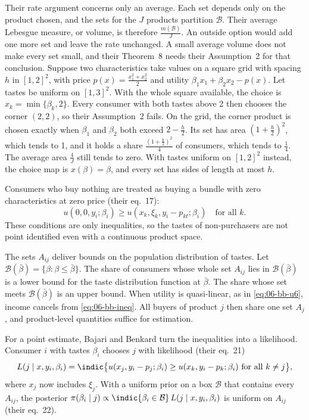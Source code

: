 Their rate argument concerns only an average. Each set depends only on the product chosen, and the sets for the $J$
products partition $\mathcal{B}$. Their average Lebesgue measure, or volume, is therefore $\frac{m(\mathcal{B})}{J}$. An
outside option would add one more set and leave the rate unchanged. A small average volume does not make every set
small, and their Theorem~8 needs their Assumption~2 for that conclusion. Suppose two characteristics take values on a square grid
with spacing $h$ in $[1,2]^2$, with price $p(x) = \frac{x_1^2 + x_2^2}{2}$ and utility $\beta_1 x_1 + \beta_2 x_2 - p(x)$. Let
tastes be uniform on $[1,3]^2$. With the whole square available, the choice is $x_k = \min\{\beta_k, 2\}$. Every
consumer with both tastes above 2 then chooses the corner $(2,2)$, so their Assumption~2 fails. On the grid, the corner product
is chosen exactly when $\beta_1$ and $\beta_2$ both exceed $2 - \frac{h}{2}$. Its set has area $(1 + \frac{h}{2})^2$,
which tends to 1, and it holds a share $\frac{(1 + \frac{h}{2})^2}{4}$ of consumers, which tends to $\frac{1}{4}$. The
average area $\frac{4}{J}$ still tends to zero. With tastes uniform on $[1,2]^2$ instead, the choice map is $x(\beta) =
\beta$, and every set has sides of length at most $h$.

Consumers who buy nothing are treated as buying a bundle with zero characteristics at zero price (their eq.~17):
\begin{equation*}
  u(0, 0, y_i; \beta_i) \ge u(x_k, \xi_k, y_i - p_{kt}; \beta_i) \quad\text{for all } k .
\end{equation*}
These conditions are only inequalities, so the tastes of non-purchasers are not point identified even with a continuous
product space.

The sets $A_{ij}$ deliver bounds on the population distribution of tastes. Let $\mathcal{B}(\bar\beta) = \{\beta : \beta \le
\bar\beta\}$. The share of consumers whose whole set $A_{ij}$ lies in $\mathcal{B}(\bar\beta)$ is a lower bound for the taste
distribution function at $\bar\beta$. The share whose set meets $\mathcal{B}(\bar\beta)$ is an upper bound. When utility is
quasi-linear, as in \eqref{eq:06-bb-u6}, income cancels from \eqref{eq:06-bb-ineq}. All buyers of product $j$ then share one
set $A_j$, and product-level quantities suffice for estimation.

For a point estimate, Bajari and Benkard turn the inequalities into a likelihood. Consumer $i$ with tastes $\beta_i$ chooses
$j$ with likelihood (their eq.~21)
\begin{equation}\label{eq:06-bb-lik}
  L(j \mid x, y_i, \beta_i) = \indic\bigl\{u(x_j, y_i - p_j; \beta_i) \ge u(x_k, y_i - p_k; \beta_i) \text{ for all } k \ne j\bigr\} ,
\end{equation}
where $x_j$ now includes $\xi_j$. With a uniform prior on a box $\mathcal{B}$ that contains every $A_{ij}$, the posterior
$\pi(\beta_i \mid j) \propto \indic\{\beta_i \in \mathcal{B}\}\, L(j \mid x, y_i, \beta_i)$ is uniform on $A_{ij}$ (their
eq.~22).

